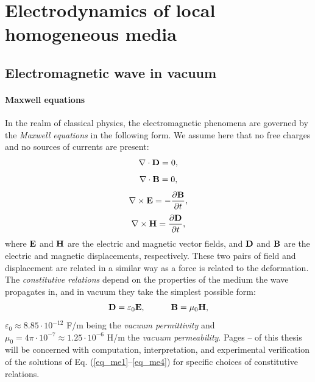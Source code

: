 
\section{Electrodynamics of local homogeneous media} %
\subsection{Electromagnetic wave in vacuum}
\paragraph{Maxwell equations}  %
In the realm of classical physics, the electromagnetic phenomena are governed by the \textit{Maxwell equations} in the following form.
We assume here that no free charges and no sources of currents are present: 
\begin{equation} \nabla \cdot  \mathbf{D} = 0, \label{eq_me1}\end{equation}  
\begin{equation} \nabla \cdot  \mathbf{B} = 0, \label{eq_me2}\end{equation}  
\begin{equation} \nabla \times \mathbf{E} = -\frac{\partial \mathbf{B}} {\partial t}, \label{eq_me3}\end{equation}  
\begin{equation} \nabla \times \mathbf{H} =  \frac{\partial \mathbf{D}} {\partial t}, \label{eq_me4}\end{equation}  
where $\mathbf{E}$ and $\mathbf{H}$ are the electric and magnetic vector fields, and $\mathbf{D}$ and $\mathbf{B}$ are the electric and magnetic displacements,
 respectively. These two pairs of field and displacement are related in a similar way as a force is related to the deformation. %
 The \textit{constitutive relations} depend on the properties of the medium the wave propagates in, and in vacuum they take the simplest possible form:
\begin{equation}		\mathbf{D} = \varepsilon_0	\mathbf{E}, \quad\quad\quad						\mathbf{B} = \mu_0			\mathbf{H},				 \label{eq_ce}\end{equation}
$\varepsilon_0 \approx 8.85\cdot10^{-12}$ F/m being the \textit{vacuum permittivity} and $\mu_0 = 4\pi \cdot 10^{-7} \approx 1.25\cdot10^{-6}$ H/m the \textit{vacuum permeability}. 
Pages \pageref{starttext}--\pageref{endtext} of this thesis will be concerned with computation, interpretation, and experimental verification of the solutions of Eq. (\ref{eq_me1}--\ref{eq_me4})  for specific choices of constitutive relations.
